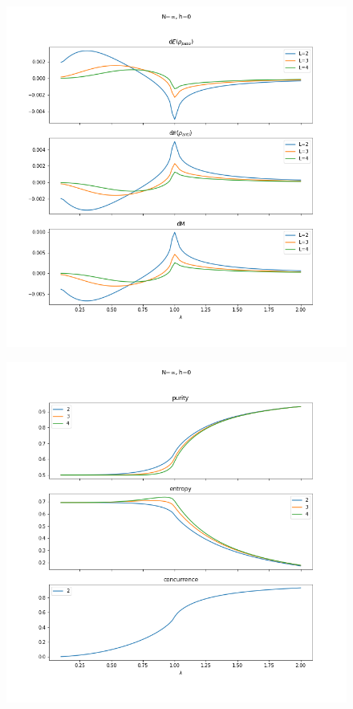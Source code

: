 \documentclass[12pt,a4paper]{article}
\begin{document}
	\begin{figure}[h]
		\centering
		\includegraphics[width=\linewidth]{d_ergostheo}
		\caption{}
		\label{fig:dergostheo}
	\end{figure}
	\begin{figure}[h]
		\centering
		\includegraphics[width=\linewidth]{theo_quantities}
		\caption{}
		\label{fig:theoquantities}
	\end{figure}



\clearpage


	
\end{document}
